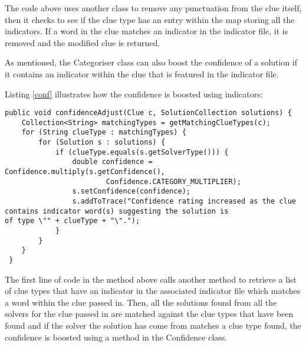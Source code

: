 The code above uses another class to remove any punctuation from the clue 
itself, then it checks to see if the clue type has an entry within the map storing all 
the indicators. If a word in the clue matches an indicator in the indicator file, it is 
removed and the modified clue is returned. 

As mentioned, the Categoriser class can also boost the confidence of a solution if 
it contains an indicator within the clue that is featured in the indicator file. 

Listing \ref{conf} illustrates how the confidence is boosted using indicators:

\begin{lstlisting}[caption={Boosting the confidence of a solution},
                   label=conf]  
 public void confidenceAdjust(Clue c, SolutionCollection solutions) {
	Collection<String> matchingTypes = getMatchingClueTypes(c);
	for (String clueType : matchingTypes) {
		for (Solution s : solutions) {
			if (clueType.equals(s.getSolverType())) {
				double confidence = Confidence.multiply(s.getConfidence(),
						Confidence.CATEGORY_MULTIPLIER);
				s.setConfidence(confidence);
				s.addToTrace("Confidence rating increased as the clue contains indicator word(s) suggesting the solution is 					of type \"" + clueType + "\".");
			}
		}
	}
 }
\end{lstlisting}

The first line of code in the method above calls another method to retrieve 
a list of clue types that have an indicator in the associated indicator file which matches a word 
within the clue passed in. Then, all the solutions found from all the solvers for the clue passed in
 are matched against the clue types that have been found and if the solver the solution has come
 from matches a clue type found, the confidence is boosted using a method in the Confidence class.